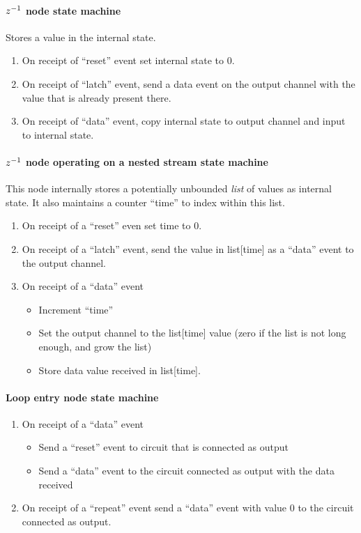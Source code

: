 \paragraph{$z^{-1}$ node state machine}

Stores a value in the internal state.

\begin{enumerate}
    \item On receipt of ``reset'' event set internal state to 0.
    \item On receipt of ``latch'' event, send a data event on the output
    channel with the value that is already present there.
    \item On receipt of ``data'' event, copy internal state to output channel and input to internal state.
\end{enumerate}

\paragraph{$z^{-1}$ node operating on a nested stream state machine}

This node internally stores a potentially 
unbounded \emph{list} of values as internal state.
It also maintains a counter ``time'' to index
within this list.

\begin{enumerate}
    \item On receipt of a ``reset'' even set time to 0.
    \item On receipt of a ``latch'' event, send the value in
    list[time] as a ``data'' event to the output channel.
    \item On receipt of a ``data'' event 
    \begin{itemize}
        \item Increment ``time''
        \item Set the output channel to the list[time] value
        (zero if the list is not long enough, and grow the list)
        \item Store data value received in list[time].
    \end{itemize}
\end{enumerate}

\paragraph{Loop entry node state machine}

\begin{enumerate}
    \item On receipt of a ``data'' event 
    \begin{itemize} 
    \item Send a ``reset'' event to circuit that is connected as output
    \item Send a ``data'' event to the circuit connected as output with
    the data received
    \end{itemize}
    \item On receipt of a ``repeat'' event send a ``data'' event with value 0
    to the circuit connected as output.
\end{enumerate}

